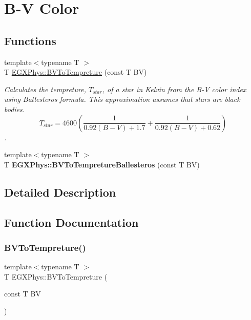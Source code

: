 \hypertarget{group___e_g_x_phys-_b_v_color}{}\section{B-\/V Color}
\label{group___e_g_x_phys-_b_v_color}
\subsection*{Functions}
\begin{DoxyCompactItemize}
\item 
{\footnotesize template$<$typename T $>$ }\\T \mbox{\hyperlink{group___e_g_x_phys-_b_v_color_ga11cf848625fe052fe9250ce2aa22253b}{E\+G\+X\+Phys\+::\+B\+V\+To\+Tempreture}} (const T BV)
\begin{DoxyCompactList}\small\item\em Calculates the tempreture, $T_{star}$, of a star in Kelvin from the B-\/V color index using Ballesteros\textquotesingle{} formula. This approximation assumes that stars are black bodies. \[T_{star}=4600 \left ( \frac{1}{0.92 (B-V)+ 1.7} + \frac{1}{0.92 (B-V) + 0.62} \right )\]. \end{DoxyCompactList}\item 
\mbox{\label{group___e_g_x_phys-_b_v_color_gacefbc01847cd5fac2bbf132937392fd1}} 
{\footnotesize template$<$typename T $>$ }\\T {\bfseries E\+G\+X\+Phys\+::\+B\+V\+To\+Tempreture\+Ballesteros} (const T BV)
\end{DoxyCompactItemize}


\subsection{Detailed Description}


\subsection{Function Documentation}
\mbox{\label{group___e_g_x_phys-_b_v_color_ga11cf848625fe052fe9250ce2aa22253b}} 
\subsubsection{\texorpdfstring{B\+V\+To\+Tempreture()}{BVToTempreture()}}
{\footnotesize\ttfamily template$<$typename T $>$ \\
T E\+G\+X\+Phys\+::\+B\+V\+To\+Tempreture (\begin{DoxyParamCaption}\item[{const T}]{BV }\end{DoxyParamCaption})}



